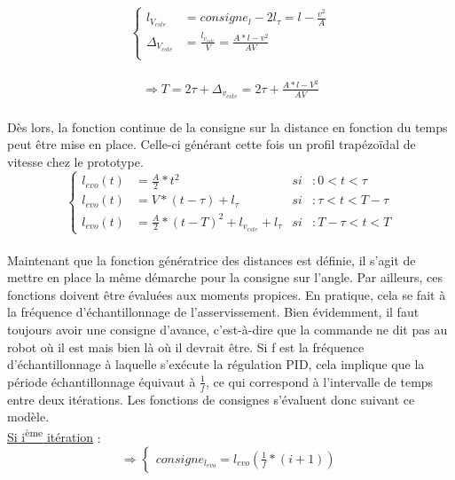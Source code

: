\documentclass[a4paper,11pt]{article}
\begin{document}
\begin{equation*}
    \left\{
        \begin{aligned}
        l_{V_{cste}} &= consigne_{l} - 2l_{\tau}  = l - \frac{v^2}{A}\\
        \Delta_{V_{cste}} &= \frac{l_{v_{cste}}}{V}  = \frac{A*l-v^2}{AV}\\
        \end{aligned}
    \right.
\end{equation*}\\
\begin{equation*}
    \left.
        \begin{aligned}
        \Rightarrow T = 2\tau + \Delta_{v_{cste}}  = 2\tau + \frac{A*l-V^2}{AV}
        \end{aligned}
    \right.
\end{equation*}\\
Dès lors, la fonction continue de la consigne sur la distance en fonction du temps peut être mise en place. Celle-ci générant cette fois un profil trapézoïdal de vitesse chez le prototype.
\begin{equation*}
    \left\{
        \begin{aligned}
        l_{evo}(t) & = \frac{A}{2}*t^2 &si&: 0<t<\tau\\
        l_{evo}(t) & = V*(t-\tau) + l_{\tau} &si&: \tau<t<T-\tau\\
        l_{evo}(t) & = \frac{A}{2}*(t-T)^2 + l_{v_{cste}} + l_{\tau} & si&: T-\tau < t < T
        \end{aligned}
    \right.
\end{equation*}\\
Maintenant que la fonction génératrice des distances est définie, il s'agit de mettre en place la même démarche pour la consigne sur l'angle. Par ailleurs, ces fonctions doivent être évaluées aux moments propices. En pratique, cela se fait à la fréquence d'échantillonnage de l'asservissement. Bien évidemment, il faut toujours avoir une consigne d'avance, c'est-à-dire que la commande ne dit pas au robot où il est mais bien là où il devrait être.
Si f est la fréquence d'échantillonnage à laquelle s'exécute la régulation PID, cela implique que la période échantillonnage équivaut à $\frac{1}{f}$, ce qui correspond à l'intervalle de temps entre deux itérations. Les fonctions de consignes s'évaluent donc suivant ce modèle.\\
\underline{Si i\textsuperscript{ème} itération} :
\begin{equation*}
    \Rightarrow\left\{
        \begin{aligned}
        consigne_{l_{evo}} = l_{evo}(\frac{1}{f}*(i+1))
        \end{aligned}
    \right.
\end{equation*}\\
\end{document}
